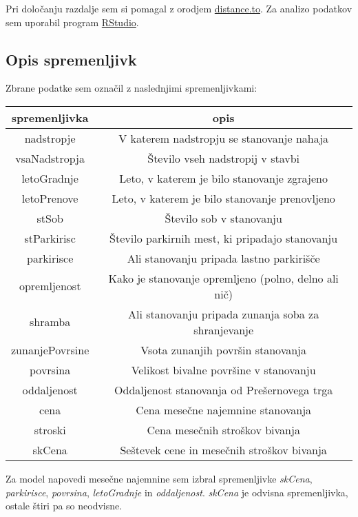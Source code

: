 \documentclass[a4paper, 12pt]{article}
\begin{document}
Pri določanju razdalje sem si pomagal z orodjem
\href{https://www.distance.to/}{distance.to}. Za analizo podatkov sem uporabil
program \href{https://rstudio.com/}{RStudio}.

\subsection{Opis spremenljivk}

Zbrane podatke sem označil z naslednjimi spremenljivkami:
\begin{center}
\begin{tabular}{ c|c}
	spremenljivka & opis \\
	\hline
	\hline
	nadstropje & V katerem nadstropju se stanovanje nahaja \\
	\hline
	vsaNadstropja & Število vseh nadstropij v stavbi \\
	\hline
	letoGradnje & Leto, v katerem je bilo stanovanje zgrajeno \\
	\hline
	letoPrenove & Leto, v katerem je bilo stanovanje prenovljeno \\
	\hline
	stSob & Število sob v stanovanju \\
	\hline
	stParkirisc & Število parkirnih mest, ki pripadajo stanovanju \\
	\hline
	parkirisce & Ali stanovanju pripada lastno parkirišče \\
	\hline
	opremljenost & Kako je stanovanje opremljeno (polno, delno ali nič) \\
	\hline
	shramba & Ali stanovanju pripada zunanja soba za shranjevanje \\
	\hline
	zunanjePovrsine & Vsota zunanjih površin stanovanja \\
	\hline
	povrsina & Velikost bivalne površine v stanovanju \\
	\hline
	oddaljenost & Oddaljenost stanovanja od Prešernovega trga \\
	\hline
	cena & Cena mesečne najemnine stanovanja \\
	\hline
	stroski & Cena mesečnih stroškov bivanja \\
	\hline
	skCena & Seštevek cene in mesečnih stroškov bivanja \\
\end{tabular}
\end{center}

Za model napovedi mesečne najemnine sem izbral spremenljivke \textit{skCena},
\textit{parkirisce}, \textit{povrsina}, \textit{letoGradnje} in
\textit{oddaljenost}. \textit{skCena} je odvisna spremenljivka, ostale štiri pa
so neodvisne.
\end{document}
